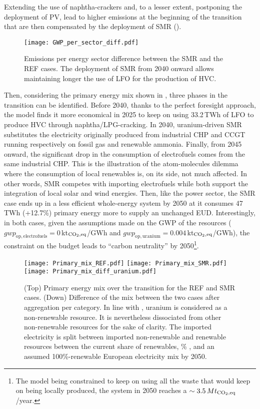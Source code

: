 Extending the use of naphtha-crackers and, to a lesser extent, postponing the deployment of PV, lead to higher  emissions at the beginning of the transition that are then compensated by the deployment of \gls{SMR} (). 

\begin{figure}[htbp!]
\centering
\texttt{[image: GWP\_per\_sector\_diff.pdf]}
\caption{Emissions per energy sector difference between the SMR and the REF cases. The deployment of \gls{SMR} from 2040 onward allows maintaining longer the use of \acrfull{LFO} for the production of \acrfull{HVC}.}
\label{fig:GWP_per_sector_diff}
\end{figure}

Then, considering the primary energy mix shown in , three phases in the transition can be identified. Before 2040, thanks to the perfect foresight approach, the model finds it more economical in 2025 to keep on using 33.2\,TWh of \gls{LFO} to produce \gls{HVC} through naphtha/LPG-cracking. In 2040, uranium-driven \gls{SMR} substitutes the electricity originally produced from industrial \gls{CHP} and \gls{CCGT} running respectively on fossil gas and renewable ammonia. Finally, from 2045 onward, the significant drop in the consumption of electrofuels comes from the same industrial \gls{CHP}. This is the illustration of the atom-molecules dilemma where the consumption of local renewables is, on its side, not much affected. In other words, \gls{SMR} competes with importing electrofuels while both support the integration of local solar and wind energies. Then, like the power sector, the SMR case ends up in a less efficient whole-energy system by 2050 at it consumes 47\,TWh (+12.7\%) primary energy more to supply an unchanged \gls{EUD}. Interestingly, in both cases, given the assumptions made on the \gls{GWP} of the resources (\ie $\mathit{gwp}_{\mathrm{op,electrofuels}}=0$\,kt$_{\ce{CO2},\text{eq}}$/GWh and $\mathit{gwp}_{\mathrm{op,uranium}}=0.004$\,kt$_{\ce{CO2},\text{eq}}$/GWh), the constraint on the  budget leads to ``carbon neutrality'' by 2050\footnote{The model being constrained to keep on using all the waste that would keep on being locally produced, the system in 2050 reaches a $\sim 3.5\,Mt_{\ce{CO2},\text{eq}}$/year.}.

\begin{figure}[htbp!]
\centering
\texttt{[image: Primary\_mix\_REF.pdf]}
\texttt{[image: Primary\_mix\_SMR.pdf]}
\texttt{[image: Primary\_mix\_diff\_uranium.pdf]}
\caption{(Top) Primary energy mix over the transition for the REF and SMR cases. (Down) Difference of the mix between the two cases after aggregation per category. In line with \citet{rixhon2021terminology}, uranium is considered as a non-renewable resource. It is nevertheless dissociated from other non-renewable resources for the sake of clarity. The imported electricity is split between imported non-renewable and renewable resources between the current share of renewables, \% \cite{eurostat_share_re_elec}, and an assumed 100\%-renewable European electricity mix by 2050.}
\label{fig:results_deter_energy_mix}
\end{figure}

